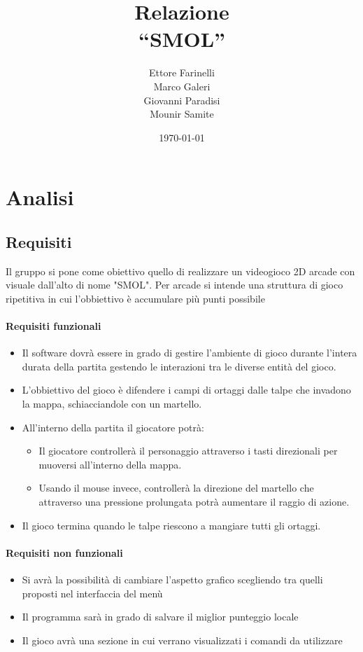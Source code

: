 \documentclass[a4paper,12pt]{report}
\title{Relazione \\``SMOL''}
\author{Ettore Farinelli \\ Marco Galeri \\ Giovanni Paradisi \\ Mounir Samite}
\date{\today}
\begin{document}
\maketitle

\tableofcontents


\chapter{Analisi}

\section{Requisiti}
Il gruppo si pone come obiettivo quello di realizzare un videogioco 2D arcade con visuale dall’alto di nome "SMOL".
Per arcade si intende una struttura di gioco ripetitiva in cui l'obbiettivo è accumulare più punti possibile
%

\subsubsection{Requisiti funzionali}
\begin{itemize}
    \item Il software dovrà essere in grado di gestire l'ambiente di gioco durante l'intera durata della partita gestendo le interazioni tra le diverse entità del gioco.
    \item L’obbiettivo del gioco è difendere i campi di ortaggi dalle talpe che invadono la mappa, schiacciandole con un martello.
    \item All'interno della partita il giocatore potrà:
    \begin{itemize}
        \item Il giocatore controllerà il personaggio attraverso i tasti direzionali per muoversi all’interno della mappa.
        \item Usando il mouse invece, controllerà la direzione del martello che attraverso una pressione prolungata potrà aumentare il raggio di azione.
    \end{itemize}
    \item Il gioco termina quando le talpe riescono a mangiare tutti gli ortaggi.
\end{itemize}
\subsubsection{Requisiti non funzionali}
\begin{itemize}
    \item Si avrà la possibilità di cambiare l'aspetto grafico scegliendo tra quelli proposti nel interfaccia del menù
    \item Il programma sarà in grado di salvare il miglior punteggio locale
    \item Il gioco avrà una sezione in cui verrano visualizzati i comandi da utilizzare
\end{itemize}
\end{document}
